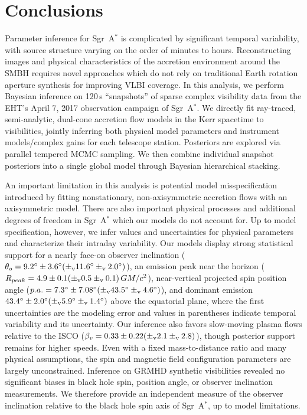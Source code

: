 \documentclass[linenumbers, twocolumn, tighten]{aastex701}
\def\sgra{Sgr~A$^*$\xspace}
\begin{document}
\section{Conclusions} \label{sec:conclusions}

Parameter inference for \sgra is complicated by significant temporal variability, with source structure varying on the order of minutes to hours. Reconstructing images and physical characteristics of the accretion environment around the SMBH requires novel approaches which do not rely on traditional Earth rotation aperture synthesis for improving VLBI coverage. In this analysis, we perform Bayesian inference on 120\,s ``snapshots'' of sparse complex visibility data from the EHT's April 7, 2017 observation campaign of \sgra. We directly fit ray-traced, semi-analytic, dual-cone accretion flow models in the Kerr spacetime to visibilities, jointly inferring both physical model parameters and instrument models/complex gains for each telescope station. Posteriors are explored via parallel tempered MCMC sampling. We then combine individual snapshot posteriors into a single global model through Bayesian hierarchical stacking.

An important limitation in this analysis is potential model misspecification introduced by fitting nonstationary, non-axisymmetric accretion flows with an axisymmetric model. There are also important physical processes and additional degrees of freedom in \sgra which our models do not account for. Up to model specification, however, we infer values and uncertainties for physical parameters and characterize their intraday variability.
Our models display strong statistical support for a nearly face-on observer inclination ($\theta_o = 9.2\degree \pm 3.6 \degree (\pm_{\rm v} 11.6\degree \pm_{\rm v} 2.0\degree)$), an emission peak near the horizon ($R_{peak} = 4.9 \pm 0.1(\pm_{\rm v} 0.5\pm_{\rm v} 0.1) \,GM/c^2$), near-vertical projected spin position angle ($p.a. = 7.3\degree \pm 7.08 \degree (\pm_{\rm v} 43.5\degree \pm_{\rm v} 4.6\degree)$), and dominant emission $43.4\degree \pm 2.0\degree (\pm_{\rm v} 5.9\degree \pm_{\rm v} 1.4\degree)$ above the equatorial plane, where the first uncertainties are the modeling error and values in parentheses indicate temporal variability and its uncertainty. Our inference also favors slow-moving plasma flows relative to the ISCO ($\beta_v = 0.33\pm 0.22 (\pm_{\rm v} 2.1\pm_{\rm v} 2.8)$), though posterior support remains for higher speeds. Even with a fixed mass-to-distance ratio and many physical assumptions, the spin and magnetic field configuration parameters are largely unconstrained. Inference on GRMHD synthetic visibilities revealed no significant biases in black hole spin, position angle, or observer inclination measurements. We therefore provide an independent measure of the observer inclination relative to the black hole spin axis of \sgra, up to model limitations.
\end{document}
